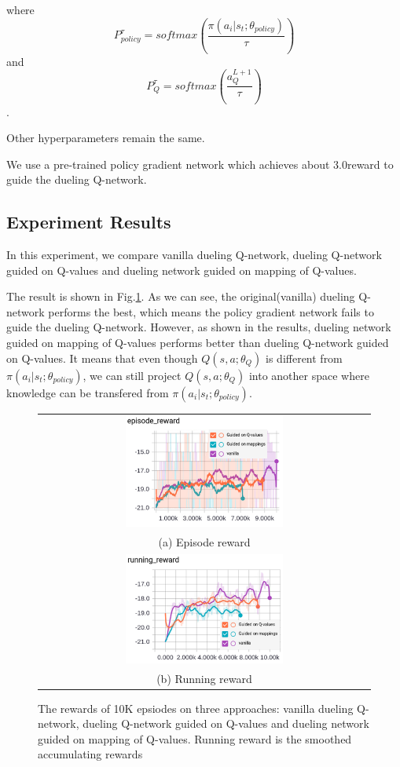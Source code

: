 \noindent
where 
$$P^{\tau}_{policy} = softmax(\frac{\pi(a_i|s_t;\theta_{policy})}{\tau})$$
and  
$$P^{\tau}_{Q} = softmax( \frac{a^{L+1}_{Q}} {\tau} )$$.

\noindent
Other hyperparameters remain the same.

%
We use a pre-trained policy gradient network which achieves about $3.0$reward to guide the dueling Q-network.


\subsection{Experiment Results}

In this experiment, we compare vanilla dueling Q-network, dueling Q-network guided on Q-values and dueling network guided on mapping of Q-values.

The result is shown in Fig.\ref{fig:mimic_result}. As we can see, the original(vanilla) dueling Q-network performs the best, which means the policy gradient network fails to guide the dueling Q-network.
%
However, as shown in the results, dueling network guided on mapping of Q-values performs better than dueling Q-network guided on Q-values. It means that even though $Q(s,a;\theta_{Q})$ is different from $\pi(a_i|s_t;\theta_{policy})$, we can still project $Q(s,a;\theta_{Q})$ into another space where knowledge can be transfered from $\pi(a_i|s_t;\theta_{policy})$.
\begin{figure}[h!]
	\centering
	\begin{tabular}{c}
		\includegraphics[width=0.49\textwidth]{./fig/mimic_result_episode.png} \\
		(a) Episode reward \\
		\includegraphics[width=0.49\textwidth]{./fig/mimic_result_running.png} \\
		(b) Running reward \\
	\end{tabular}
	\caption{The rewards of 10K epsiodes on three approaches: vanilla dueling Q-network, dueling Q-network guided on Q-values and dueling network guided on mapping of Q-values. Running reward is the smoothed accumulating rewards}
	\label{fig:mimic_result}
\end{figure}



